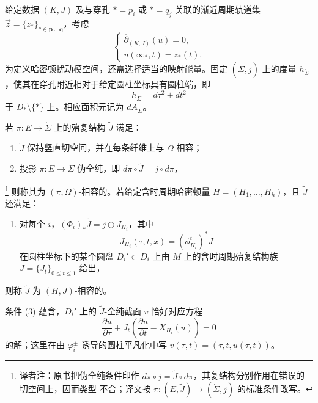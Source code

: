 给定\personFloer{}数据 $(K,J)$ 及与穿孔 $*=p_i$ 或 $*=q_j$ 关联的渐近周期轨道集
$\vec z=\{z_*\}_{*\in\mathbf p\cup\mathbf q}$，考虑
\begin{equation}
 \begin{cases}
 \overline\partial_{(K,J)}(u)=0,\\
 u(\infty_*,t)=z_*(t).
 \end{cases}
 \label{eq:20-asymptotic-perturbed-cr}
\end{equation}
为定义哈密顿扰动模空间，还需选择适当的映射能量。固定 $(\dot\Sigma,j)$ 上的\personKahler{}度量 $h_{\dot\Sigma}$，使其在穿孔附近相对于给定圆柱坐标具有圆柱端，即
\begin{equation}
 h_{\dot\Sigma}=d\tau^2+dt^2
 \label{eq:20-cylindrical-metric}
\end{equation}
于 $D_*\setminus\{*\}$ 上。相应面积元记为 $dA_{\dot\Sigma}$。

\begin{definition}
\label{def:20-compatible-total-j}
若 $\pi:E\to\dot\Sigma$ 上的殆复结构 $\widetilde J$ 满足：
\begin{enumerate}[label=(\arabic*)]
\item $\widetilde J$ 保持竖直切空间，并在每条纤维上与 $\Omega$ 相容；
\item 投影 $\pi:E\to\dot\Sigma$ 伪全纯，即 $d\pi\circ\widetilde J=j\circ d\pi$，
\end{enumerate}
\footnote{译者注：原书把伪全纯条件印作
$d\pi\circ j=\widetilde J\circ d\pi$，其复结构分别作用在错误的切空间上，因而类型
不合；译文按 $\pi:(E,\widetilde J)\to(\dot\Sigma,j)$ 的标准条件改写。}
则称其为 $(\pi,\Omega)$-相容的。若给定含时周期哈密顿量
$H=(H_1,\ldots,H_h)$，且 $\widetilde J$ 还满足：
\begin{enumerate}[label=(\arabic*),start=3]
\item 对每个 $i$，$(\Phi_i)_*\widetilde J=j\oplus J_{H_i}$，其中
\[
 J_{H_i}(\tau,t,x)=(\phi_{H_i}^t)^*J
\]
在圆柱坐标下的某个圆盘 $D_i'\subset D_i$ 上由 $M$ 上的含时周期殆复结构族
$J=\{J_t\}_{0\leq t\leq1}$ 给出，
\end{enumerate}
则称 $\widetilde J$ 为 $(H,J)$-相容的。
\end{definition}

条件 (3) 蕴含，$D_i'$ 上的 $\widetilde J$-全纯截面 $v$ 恰好对应方程
\begin{equation}
 \frac{\partial u}{\partial\tau}
 +J_t\left(\frac{\partial u}{\partial t}-X_{H_i}(u)\right)=0
 \label{eq:20-floer-equation-at-end}
\end{equation}
的解；这里在由 $\varphi_i^\pm$ 诱导的圆柱平凡化中写
$v(\tau,t)=(\tau,t,u(\tau,t))$。

